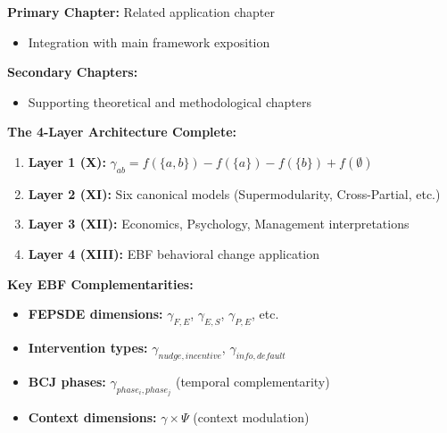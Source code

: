 \begin{tcolorbox}[colback=purple!5!white, colframe=purple!75!black,
    title=Chapter Linkage]

\textbf{Primary Chapter:} Related application chapter
\begin{itemize}[nosep]
\item Integration with main framework exposition
\end{itemize}

\textbf{Secondary Chapters:}
\begin{itemize}[nosep]
\item Supporting theoretical and methodological chapters
\end{itemize}

\end{tcolorbox}

\begin{tcolorbox}[colback=blue!5!white,colframe=blue!75!black,title=\textbf{Quick Reference: EBF Complementarity}]
\textbf{The 4-Layer Architecture Complete:}
\begin{enumerate}[noitemsep]
    \item \textbf{Layer 1 (X):} $\gamma_{ab} = f(\{a,b\}) - f(\{a\}) - f(\{b\}) + f(\emptyset)$
    \item \textbf{Layer 2 (XI):} Six canonical models (Supermodularity, Cross-Partial, etc.)
    \item \textbf{Layer 3 (XII):} Economics, Psychology, Management interpretations
    \item \textbf{Layer 4 (XIII):} EBF behavioral change application
\end{enumerate}

\textbf{Key EBF Complementarities:}
\begin{itemize}[noitemsep]
    \item \textbf{FEPSDE dimensions:} $\gamma_{F,E}$, $\gamma_{E,S}$, $\gamma_{P,E}$, etc.
    \item \textbf{Intervention types:} $\gamma_{nudge,incentive}$, $\gamma_{info,default}$
    \item \textbf{BCJ phases:} $\gamma_{phase_i, phase_j}$ (temporal complementarity)
    \item \textbf{Context dimensions:} $\gamma \times \Psi$ (context modulation)
\end{itemize}
\end{tcolorbox}

